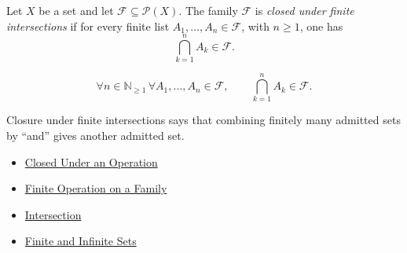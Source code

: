 \begin{definition}\label{def:closed-under-finite-intersections}
Let \(X\) be a set and let \(\mathcal{F}\subseteq\mathcal{P}(X)\).  The family
\(\mathcal{F}\) is \emph{closed under finite intersections} if for every
finite list \(A_1,\dots,A_n\in\mathcal{F}\), with \(n\geq 1\), one has
\[
  \bigcap_{k=1}^{n} A_k \in \mathcal{F}.
\]
\end{definition}

\begin{remark*}
\[
  \forall n\in\mathbb{N}_{\geq 1}\,
  \forall A_1,\dots,A_n\in\mathcal{F},\qquad
  \bigcap_{k=1}^{n}A_k\in\mathcal{F}.
\]
\end{remark*}

\begin{remark*}[Interpretation]
Closure under finite intersections says that combining finitely many admitted
sets by ``and'' gives another admitted set.
\end{remark*}

\begin{dependencies}
\begin{itemize}
  \item \hyperref[def:closed-under-operation]{Closed Under an Operation}
  \item \hyperref[def:finite-operation-on-family]{Finite Operation on a Family}
  \item \hyperref[def:intersection]{Intersection}
  \item \hyperref[def:finite-infinite]{Finite and Infinite Sets}
\end{itemize}
\end{dependencies}
